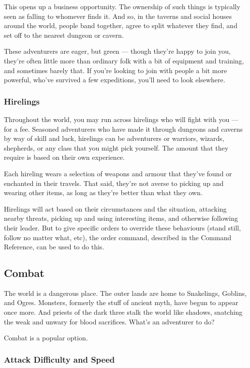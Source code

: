 This opens up a business opportunity.  The ownership of such things is typically
seen as falling to whomever finds it.  And so, in the taverns and social houses
around the world, people band together, agree to split whatever they find, and
set off to the nearest dungeon or cavern.  

These adventurers are eager, but green --- though they're happy to join you,
they're often little more than ordinary folk with a bit of equipment and 
training, and sometimes barely that.  If you're looking to join with people a 
bit more powerful, who've survived a few expeditions, you'll need to look 
elsewhere.

\subsubsection{Hirelings}
Throughout the world, you may run across hirelings who will fight with you ---
for a fee.  Seasoned adventurers who have made it through dungeons and caverns
by way of skill and luck, hirelings can be adventurers or warriors, wizards,
shepherds, or any class that you might pick yourself.  The amount that they
require is based on their own experience.

Each hireling wears a selection of weapons and armour that they've found or
enchanted in their travels.  That said, they're not averse to picking up and
wearing other items, as long as they're better than what they own.

Hirelings will act based on their circumstances and the situation, attacking
nearby threats, picking up and using interesting items, and otherwise following
their leader.  But to give specific orders to override these behaviours (stand
still, follow no matter what, etc), the order command, described in the 
Command Reference, can be used to do this.

\subsection{Combat}

The world is a dangerous place.  The outer lands are home to Snakelings,
Goblins, and Ogres.  Monsters, formerly the stuff of ancient myth, have
begun to appear once more.  And priests of the dark three stalk the world
like shadows, snatching the weak and unwary for blood sacrifices.  What's
an adventurer to do?

Combat is a popular option.

\subsubsection{Attack Difficulty and Speed}

